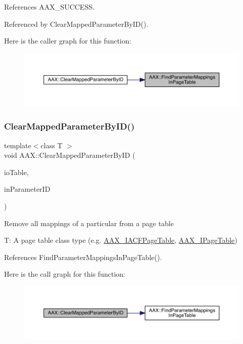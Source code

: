 References A\+A\+X\+\_\+\+S\+U\+C\+C\+E\+SS.



Referenced by Clear\+Mapped\+Parameter\+By\+I\+D().

Here is the caller graph for this function\+:
\nopagebreak
\begin{figure}[H]
\begin{center}
\leavevmode
\includegraphics[width=350pt]{a00852_ac87bacdbc6323ab3f099c16ed8b508be_icgraph}
\end{center}
\end{figure}
\mbox{\label{a00852_ae583643c21c696c4d094a500b4e6d77e}} 
\subsubsection{\texorpdfstring{ClearMappedParameterByID()}{ClearMappedParameterByID()}}
{\footnotesize\ttfamily template$<$class T $>$ \\
void A\+A\+X\+::\+Clear\+Mapped\+Parameter\+By\+ID (\begin{DoxyParamCaption}\item[{T \&}]{io\+Table,  }\item[{\mbox{\hyperlink{a00392_a1440c756fe5cb158b78193b2fc1780d1}{A\+A\+X\+\_\+\+C\+Param\+ID}}}]{in\+Parameter\+ID }\end{DoxyParamCaption})\hspace{0.3cm}{\ttfamily [inline]}}

Remove all mappings of a particular from a page table

{\ttfamily T\+:} A page table class type (e.\+g. \mbox{\hyperlink{a01725}{A\+A\+X\+\_\+\+I\+A\+C\+F\+Page\+Table}}, \mbox{\hyperlink{a01849}{A\+A\+X\+\_\+\+I\+Page\+Table}}) 

References Find\+Parameter\+Mappings\+In\+Page\+Table().

Here is the call graph for this function\+:
\nopagebreak
\begin{figure}[H]
\begin{center}
\leavevmode
\includegraphics[width=350pt]{a00852_ae583643c21c696c4d094a500b4e6d77e_cgraph}
\end{center}
\end{figure}
\mbox{\label{a00852_aa3db8a743884054a6ac1ec2c2495e86f}} 
